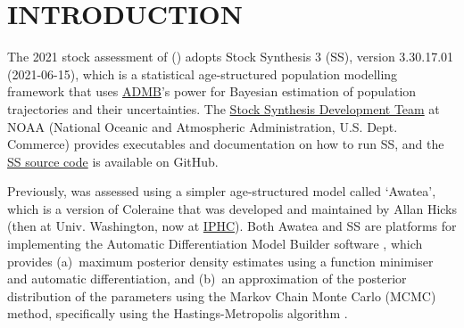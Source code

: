 \documentclass[11pt]{book}
\begin{document}
\newcommand{\LH}{}%
\newcommand{\RH}{}%
\newcommand{\LF}{\spn{} 2021}
\newcommand{\RF}{Appendix~\thechapter ~-- Model Equations}

\lhead{\LH}\rhead{\RH}\lfoot{\LF}\rfoot{\RF}

\newcommand{\nSims}{4000}
\newcommand{\nChains}{8}
\newcommand{\cSims}{500}
\newcommand{\cBurn}{250}
\newcommand{\cSamps}{250}
\newcommand{\Nmcmc}{2000}
\newcommand{\Nbase}{10,000}

\newcommand{\numMCMC}{1000}
\newcommand{\sRate}{5000}
\newcommand{\nSamps}{1200}
\newcommand{\nBurn}{200}
\newcommand{\harvestMax}{0.401}
\newcommand{\harvestInc}{0.001}
\newcommand{\policyMax}{3000}
\newcommand{\policyInc}{500 (or 250)}
\newcommand{\currYear}{2022} %
\newcommand{\prevYear}{2021} %
\newcommand{\projYear}{2032} %

\section{INTRODUCTION}%

The 2021 stock assessment of \spn{} (\spc) adopts Stock Synthesis 3 (SS), version 3.30.17.01 (2021-06-15), which is a statistical age-structured population modelling framework \citep{Methot-Wetzel:2013} that uses \href{https://www.admb-project.org/}{ADMB}'s power for Bayesian estimation of population trajectories and their uncertainties.
The \href{https://vlab.noaa.gov/web/stock-synthesis}{Stock Synthesis Development Team} at NOAA (National Oceanic and Atmospheric Administration, U.S. Dept. Commerce) provides executables and documentation on how to run SS, and the \href{https://github.com/nmfs-stock-synthesis/stock-synthesis}{SS source code} is available on GitHub.

Previously, \spc{} was assessed using a simpler age-structured model called `Awatea', which is a version of Coleraine \citep{Hilborn-etal:2003} that was developed and maintained by Allan Hicks (then at Univ. Washington, now at \href{https://www.iphc.int/}{IPHC}).
Both Awatea and SS are platforms for implementing the Automatic Differentiation Model Builder software \citep{ADMB:2009}, which provides (a)~maximum posterior density estimates using a function minimiser and automatic differentiation, and (b)~an approximation of the posterior distribution of the parameters using the Markov Chain Monte Carlo (MCMC) method, specifically using the Hastings-Metropolis algorithm \citep{Gelman-etal:2004}.
\end{document}
